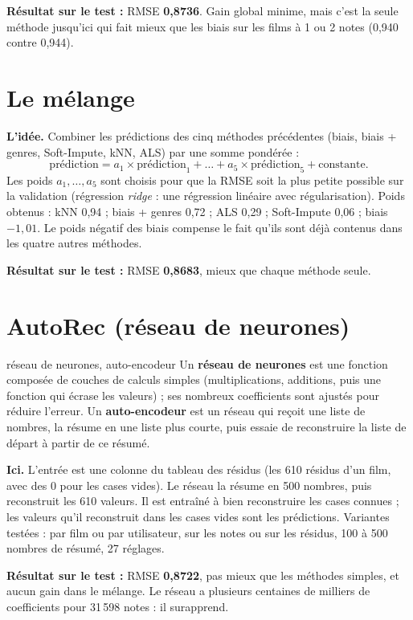 \documentclass[11pt,a4paper]{article}
\newcommand{\resultat}[1]{\par\textbf{Résultat sur le test :} #1\par}
\begin{document}
\resultat{RMSE \textbf{0,8736}. Gain global minime, mais c'est la seule méthode jusqu'ici
qui fait mieux que les biais sur les films à 1 ou 2 notes (0,940 contre 0,944).}

\section{Le mélange}

\textbf{L'idée.} Combiner les prédictions des cinq méthodes précédentes (biais,
biais + genres, Soft-Impute, kNN, ALS) par une somme pondérée :
\[
  \text{prédiction} = a_1 \times \text{prédiction}_1 + \dots + a_5 \times \text{prédiction}_5 + \text{constante}.
\]
Les poids $a_1, \dots, a_5$ sont choisis pour que la RMSE soit la plus petite possible sur
la validation (régression \emph{ridge} : une régression linéaire avec régularisation).
Poids obtenus : kNN 0,94 ; biais + genres 0,72 ; ALS 0,29 ; Soft-Impute 0,06 ;
biais $-1{,}01$. Le poids négatif des biais compense le fait qu'ils sont déjà contenus dans
les quatre autres méthodes.

\resultat{RMSE \textbf{0,8683}, mieux que chaque méthode seule.}

\section{AutoRec (réseau de neurones)}

\begin{definition}{réseau de neurones, auto-encodeur}
Un \textbf{réseau de neurones} est une fonction composée de couches de calculs simples
(multiplications, additions, puis une fonction qui \og écrase \fg{} les valeurs) ; ses
nombreux coefficients sont ajustés pour réduire l'erreur. Un \textbf{auto-encodeur} est un
réseau qui reçoit une liste de nombres, la résume en une liste plus courte, puis essaie de
reconstruire la liste de départ à partir de ce résumé.
\end{definition}

\textbf{Ici.} L'entrée est une colonne du tableau des résidus (les 610 résidus d'un film,
avec des 0 pour les cases vides). Le réseau la résume en 500 nombres, puis reconstruit
les 610 valeurs. Il est entraîné à bien reconstruire les cases connues ; les valeurs qu'il
reconstruit dans les cases vides sont les prédictions. Variantes testées : par film ou par
utilisateur, sur les notes ou sur les résidus, 100 à 500 nombres de résumé, 27 réglages.

\resultat{RMSE \textbf{0,8722}, pas mieux que les méthodes simples, et aucun gain dans le
mélange. Le réseau a plusieurs centaines de milliers de coefficients pour 31\,598 notes :
il surapprend.}
\end{document}
